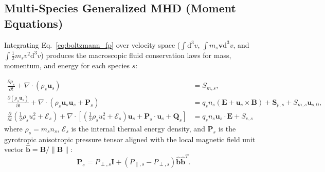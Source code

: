 \documentclass[11pt,a4paper]{article}
\newcommand{\vect}[1]{\bm{#1}}
\newcommand{\dd}{\mathrm{d}}
\newcommand{\pderiv}[2]{\frac{\partial #1}{\partial #2}}
\begin{document}
\subsection{Multi-Species Generalized MHD (Moment Equations)}
Integrating Eq.~\eqref{eq:boltzmann_fp} over velocity space ($\int \dd^3 v$, $\int m_s \vect{v} \dd^3 v$, and $\int \frac{1}{2} m_s v^2 \dd^3 v$) produces the macroscopic fluid conservation laws for mass, momentum, and energy for each species $s$:

\begin{align}
    \pderiv{\rho_s}{t} + \nabla \cdot (\rho_s \vect{u}_s) &= S_{m,s}, \label{eq:gen_mass} \\
    \pderiv{(\rho_s \vect{u}_s)}{t} + \nabla \cdot \left( \rho_s \vect{u}_s \vect{u}_s + \mathbf{P}_s \right) &= q_s n_s \left( \vect{E} + \vect{u}_s \times \vect{B} \right) + \vect{S}_{p,s} + S_{m,s} \vect{u}_{s,0}, \label{eq:gen_mom} \\
    \pderiv{}{t} \left( \frac{1}{2} \rho_s u_s^2 + \mathcal{E}_s \right) + \nabla \cdot \left[ \left( \frac{1}{2} \rho_s u_s^2 + \mathcal{E}_s \right) \vect{u}_s + \mathbf{P}_s \cdot \vect{u}_s + \vect{Q}_s \right] &= q_s n_s \vect{u}_s \cdot \vect{E} + S_{e,s} \label{eq:gen_energy}
\end{align}
where $\rho_s = m_s n_s$, $\mathcal{E}_s$ is the internal thermal energy density, and $\mathbf{P}_s$ is the gyrotropic anisotropic pressure tensor aligned with the local magnetic field unit vector $\hat{\vect{b}} = \vect{B}/\|\vect{B}\|$:
\begin{equation}
    \mathbf{P}_s = P_{\perp,s} \mathbf{I} + \left( P_{\parallel,s} - P_{\perp,s} \right) \hat{\vect{b}}\hat{\vect{b}}^T.
    \label{eq:anisotropic_p}
\end{equation}
\end{document}
